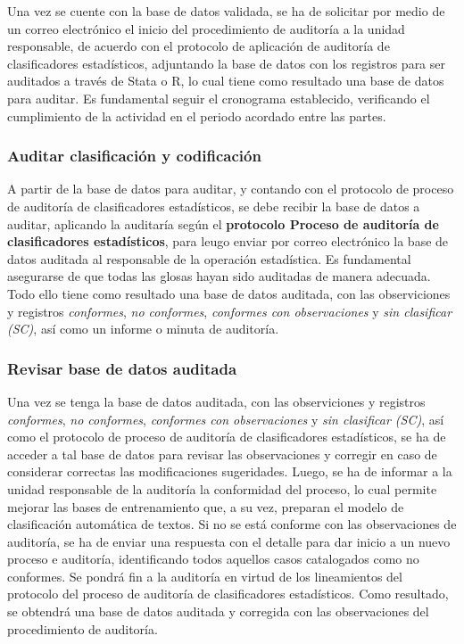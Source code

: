 \documentclass[
]{article}
\begin{document}
Una vez se cuente con la base de datos validada, se ha de solicitar por medio de un correo electrónico el inicio del procedimiento de auditoría a la unidad responsable, de acuerdo con el protocolo de aplicación de auditoría de clasificadores estadísticos, adjuntando la base de datos con los registros para ser auditados a través de Stata o R, lo cual tiene como resultado una base de datos para auditar. Es fundamental seguir el cronograma establecido, verificando el cumplimiento de la actividad en el periodo acordado entre las partes.

\hypertarget{auditar-clasificaciuxf3n-y-codificaciuxf3n}{%
\subsubsection{Auditar clasificación y codificación}\label{auditar-clasificaciuxf3n-y-codificaciuxf3n}}

A partir de la base de datos para auditar, y contando con el protocolo de proceso de auditoría de clasificadores estadísticos, se debe recibir la base de datos a auditar, aplicando la auditaría según el \textbf{protocolo Proceso de auditoría de clasificadores estadísticos}, para leugo enviar por correo electrónico la base de datos auditada al responsable de la operación estadística. Es fundamental asegurarse de que todas las glosas hayan sido auditadas de manera adecuada. Todo ello tiene como resultado una base de datos auditada, con las observiciones y registros \emph{conformes}, \emph{no conformes}, \emph{conformes con observaciones} y \emph{sin clasificar (SC)}, así como un informe o minuta de auditoría.

\hypertarget{revisar-base-de-datos-auditada}{%
\subsubsection{Revisar base de datos auditada}\label{revisar-base-de-datos-auditada}}

Una vez se tenga la base de datos auditada, con las observiciones y registros \emph{conformes}, \emph{no conformes}, \emph{conformes con observaciones} y \emph{sin clasificar (SC)}, así como el protocolo de proceso de auditoría de clasificadores estadísticos, se ha de acceder a tal base de datos para revisar las observaciones y corregir en caso de considerar correctas las modificaciones sugeridades. Luego, se ha de informar a la unidad responsable de la auditoría la conformidad del proceso, lo cual permite mejorar las bases de entrenamiento que, a su vez, preparan el modelo de clasificación automática de textos. Si no se está conforme con las observaciones de auditoría, se ha de enviar una respuesta con el detalle para dar inicio a un nuevo proceso e auditoría, identificando todos aquellos casos catalogados como no conformes. Se pondrá fin a la auditoría en virtud de los lineamientos del protocolo del proceso de auditoría de clasificadores estadísticos. Como resultado, se obtendrá una base de datos auditada y corregida con las observaciones del procedimiento de auditoría.
\end{document}
